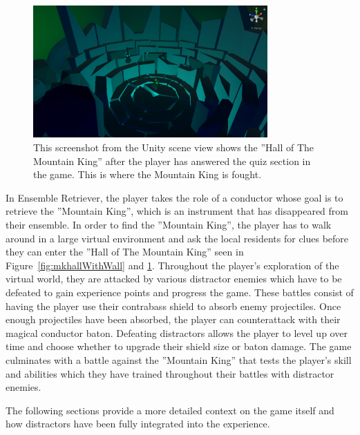 \begin{figure}[tbph]
    \centering
    \includegraphics[width=0.8\textwidth]{figures/screenshots/HallOfTheMountainKing2KindaLowRes.png}
    \caption[Screenshot of the ''Hall of The Mountain King'' Without the Quiz Wall]{This screenshot from the Unity scene view shows the ''Hall of The Mountain King'' after the player has answered the quiz section in the game. This is where the Mountain King is fought.}
    \label{fig:mkhallWithoutWall}
\end{figure}
In Ensemble Retriever, the player takes the role of a conductor whose goal is to retrieve the ''Mountain King'', which is an instrument that has disappeared from their ensemble. In order to find the ''Mountain King'', the player has to walk around in a large virtual environment and ask the local residents for clues before they can enter the ''Hall of The Mountain King'' seen in Figure~\ref{fig:mkhallWithWall} and \ref{fig:mkhallWithoutWall}. Throughout the player's exploration of the virtual world, they are attacked by various distractor enemies which have to be defeated to gain experience points and progress the game. These battles consist of having the player use their contrabass shield to absorb enemy projectiles. Once enough projectiles have been absorbed, the player can counterattack with their magical conductor baton. Defeating distractors allows the player to level up over time and choose whether to upgrade their shield size or baton damage. The game culminates with a battle against the ''Mountain King'' that tests the player's skill and abilities which they have trained throughout their battles with distractor enemies.  

The following sections provide a more detailed context on the game itself and how distractors have been fully integrated into the experience.

